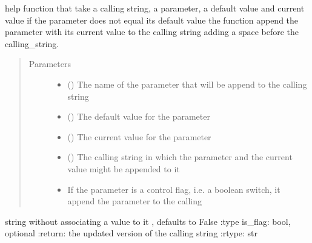 \documentclass[letterpaper,10pt,english]{sphinxmanual}
\begin{document}
\begin{fulllineitems}
\label{\detokenize{IPTK.Utils:IPTK.Utils.UtilityFunction.append_to_calling_string}}
help function that take a calling string, a parameter, a default value and current value     if the parameter does not equal its default value the function append the parameter with its current 
value to the calling string adding a space before the calling\_string.
\begin{quote}\begin{description}
\item[{Parameters}] \leavevmode\begin{itemize}
\item {} 
 () \textendash{} The name of the parameter that will be append to the calling string

\item {} 
 (\sphinxstyleliteralemphasis{\sphinxupquote{{[}}}\sphinxstyleliteralemphasis{\sphinxupquote{{]}}}) \textendash{} The default value for the parameter

\item {} 
 (\sphinxstyleliteralemphasis{\sphinxupquote{{[}}}\sphinxstyleliteralemphasis{\sphinxupquote{{]}}}) \textendash{} The current value for the parameter

\item {} 
 () \textendash{} The calling string in which the parameter and the current value might be appended to it

\item {} 
 \textendash{} If the parameter is a control flag, i.e. a boolean switch, it append the parameter to the calling 

\end{itemize}

\end{description}\end{quote}

string without associating a value to it , defaults to False
:type is\_flag: bool, optional
:return: the updated version of the calling string 
:rtype: str

\end{fulllineitems}
\end{document}

